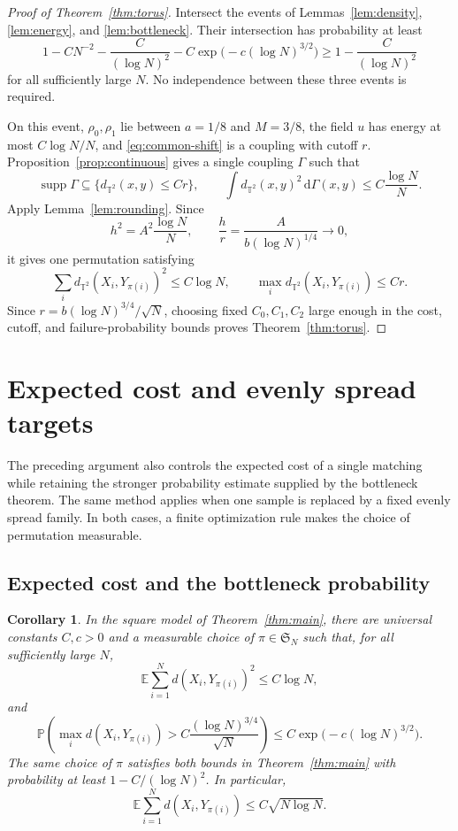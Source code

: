 \documentclass[11pt]{article}
\newcommand{\Pbb}{\mathbb P}
\newcommand{\Ebb}{\mathbb E}
\newcommand{\T}{\mathbb T^2}
\newcommand{\supp}{\operatorname{supp}}
\newtheorem{corollary}[theorem]{Corollary}
\theoremstyle{remark}
\numberwithin{equation}{section}
\begin{document}
\begin{proof}[Proof of Theorem~\ref{thm:torus}]
Intersect the events of Lemmas~\ref{lem:density},
\ref{lem:energy}, and \ref{lem:bottleneck}. Their intersection has
probability at least
\[
 1-CN^{-2}-\frac C{(\log N)^2}
   -C\exp\bigl(-c(\log N)^{3/2}\bigr)
 \ge1-\frac C{(\log N)^2}
\]
for all sufficiently large \(N\). No independence between these
three events is required.

On this event, \(\rho_0,\rho_1\) lie between \(a=1/8\) and
\(M=3/8\), the field \(u\) has energy at most \(C\log N/N\),
and \eqref{eq:common-shift} is a coupling with cutoff \(r\).
Proposition~\ref{prop:continuous} gives a single coupling
\(\Gamma\) such that
\[
 \supp\Gamma\subseteq\{d_{\T}(x,y)\le Cr\},
 \qquad
 \int d_{\T}(x,y)^2\,\mathrm d\Gamma(x,y)
 \le C\frac{\log N}{N}.
\]
Apply Lemma~\ref{lem:rounding}. Since
\[
 h^2=A^2\frac{\log N}{N},
 \qquad
 \frac hr=\frac{A}{b(\log N)^{1/4}}\longrightarrow0,
\]
it gives one permutation satisfying
\[
 \sum_i d_{\T}(X_i,Y_{\pi(i)})^2\le C\log N,
 \qquad
 \max_i d_{\T}(X_i,Y_{\pi(i)})\le Cr.
\]
Since \(r=b(\log N)^{3/4}/\sqrt N\), choosing fixed
\(C_0,C_1,C_2\) large enough in the cost, cutoff, and
failure-probability bounds proves Theorem~\ref{thm:torus}.
\end{proof}

\section{Expected cost and evenly spread targets}
\label{sec:further}

The preceding argument also controls the expected cost of a single
matching while retaining the stronger probability estimate supplied by
the bottleneck theorem. The same method applies when one sample is
replaced by a fixed evenly spread family. In both cases, a finite
optimization rule makes the choice of permutation measurable.

\subsection{Expected cost and the bottleneck probability}

\begin{corollary}
\label{cor:expected}
In the square model of Theorem~\ref{thm:main}, there are universal
constants \(C,c>0\) and a measurable choice of
\(\pi\in\mathfrak S_N\) such that, for all sufficiently large \(N\),
\[
 \Ebb\sum_{i=1}^N d(X_i,Y_{\pi(i)})^2\le C\log N,
\]
and
\[
 \Pbb\left(
  \max_i d(X_i,Y_{\pi(i)})>
  C\frac{(\log N)^{3/4}}{\sqrt N}
 \right)
 \le C\exp\bigl(-c(\log N)^{3/2}\bigr).
\]
The same choice of \(\pi\) satisfies both bounds in
Theorem~\ref{thm:main} with probability at least
\(1-C/(\log N)^2\). In particular,
\[
 \Ebb\sum_{i=1}^N d(X_i,Y_{\pi(i)})
 \le C\sqrt{N\log N}.
\]
\end{corollary}
\end{document}
